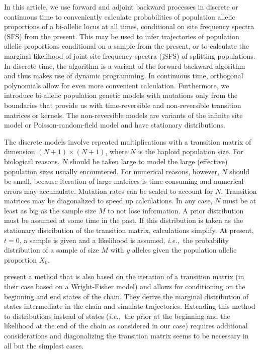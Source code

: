 \documentclass[preprint]{elsarticle}
\newcommand\ie{{\it i.e.,}}
\newcommand\x[1]{\ensuremath{X_{#1}}}
\begin{document}
In this article, we use forward and adjoint backward processes in discrete or continuous time to conveniently calculate probabilities of population allelic proportions of a bi-allelic locus at all times, conditional on site frequency spectra (SFS) from the present. This may be used to infer trajectories of population allelic proportions conditional on a sample from the present, or to calculate the marginal likelihood of joint site frequency spectra (jSFS) of splitting populations. In discrete time, the algorithm is a variant of the forward-backward algorithm and thus makes use of dynamic programming. In continuous time, orthogonal polynomials allow for even more convenient calculation. Furthermore, we introduce bi-allelic population genetic models with mutations only from the boundaries that provide us with time-reversible and non-reversible transition matrices or kernels. The non-reversible models are variants of the infinite site model \citep{Kimu69} or Poisson-random-field model \citep{Sawy92} and have stationary distributions.

The discrete models involve repeated multiplications with a transition matrix of dimension $(N+1)\times(N+1)$, where $N$ is the haploid population size. For biological reasons, $N$ should be taken large to model the large (effective) population sizes usually encountered. For numerical reasons, however, $N$ should be small, because iteration of large matrices is time-consuming and numerical errors may accumulate. Mutation rates can be scaled to account for $N$. Transition matrices may be diagonalized to speed up calculations. In any case, $N$ must be at least as big as the sample size $M$ to not lose information. A prior distribution must be assumed at some time in the past. If this distribution is taken as the stationary distribution of the transition matrix, calculations simplify. At present, $t=0$, a sample is given and a likelihood is assumed, \ie\ the probability distribution of a sample of size $M$ with $y$ alleles given the population allelic proportion $\x{0}$.

\citet{Zhao14} present a method that is also based on the iteration of a transition matrix (in their case based on a Wright-Fisher model) and allows for conditioning on the beginning and end states of the chain. They derive the marginal distribution of states intermediate in the chain and simulate trajectories. Extending this method to distributions instead of states (\ie\ the prior at the beginning and the likelihood at the end of the chain as considered in our case) requires additional considerations and diagonalizing the transition matrix seems to be necessary in all but the simplest cases. 
\end{document}
